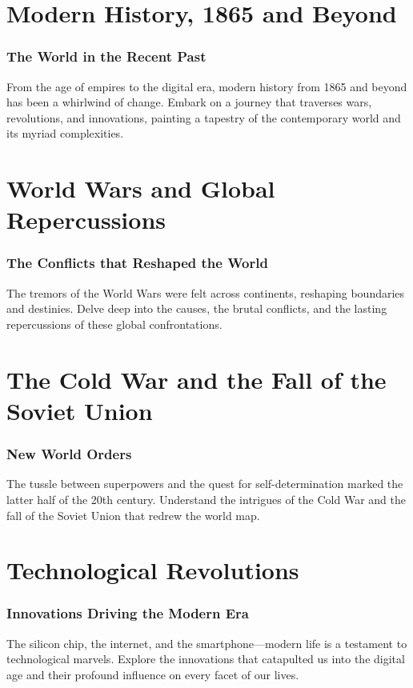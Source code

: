 \documentclass[a4paper,12pt]{book}
\begin{document}
\chapter{Modern History, 1865 and Beyond}
\subsection*{The World in the Recent Past}
From the age of empires to the digital era, modern history from 1865 and beyond has been a whirlwind of change. Embark on a journey that traverses wars, revolutions, and innovations, painting a tapestry of the contemporary world and its myriad complexities.

\chapter{World Wars and Global Repercussions}
\subsection*{The Conflicts that Reshaped the World}
The tremors of the World Wars were felt across continents, reshaping boundaries and destinies. Delve deep into the causes, the brutal conflicts, and the lasting repercussions of these global confrontations.

\chapter{The Cold War and the Fall of the Soviet Union}
\subsection*{New World Orders}
The tussle between superpowers and the quest for self-determination marked the latter half of the 20th century. Understand the intrigues of the Cold War and the fall of the Soviet Union that redrew the world map.

\chapter{Technological Revolutions}
\subsection*{Innovations Driving the Modern Era}
The silicon chip, the internet, and the smartphone—modern life is a testament to technological marvels. Explore the innovations that catapulted us into the digital age and their profound influence on every facet of our lives.
\end{document}
